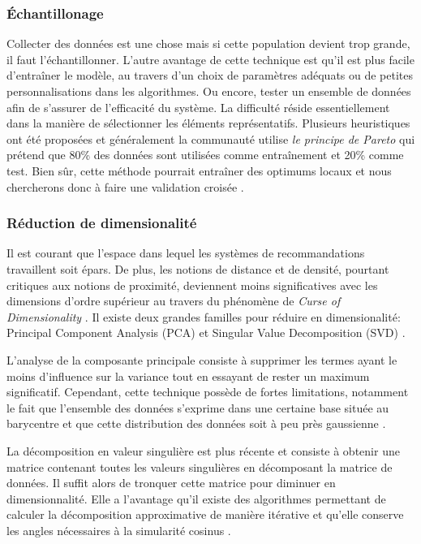 \subsubsection{Échantillonage}

Collecter des données est une chose mais si cette population devient trop grande, il faut l'échantillonner. L'autre avantage de cette technique est qu'il est plus facile d'entraîner le modèle, au travers d'un choix de paramètres adéquats ou de petites personnalisations dans les algorithmes. Ou encore, tester un ensemble de données afin de s'assurer de l'efficacité du système. La difficulté réside essentiellement dans la manière de sélectionner les éléments représentatifs. Plusieurs heuristiques ont été proposées et généralement la communauté utilise \textit{le principe de Pareto} qui prétend que 80\% des données sont utilisées comme entraînement et 20\% comme test. Bien sûr, cette méthode pourrait entraîner des optimums locaux et nous chercherons donc à faire une validation croisée \cite{kohavi1995study}.

\subsubsection{Réduction de dimensionalité} \label{subsubsec:Dimensionality Reduction}

Il est courant que l'espace dans lequel les systèmes de recommandations travaillent soit épars. De plus, les notions de distance et de densité, pourtant critiques aux notions de proximité, deviennent moins significatives avec les dimensions d'ordre supérieur au travers du phénomène de \textit{Curse of Dimensionality} \cite{bellman1957dynamic}. Il existe deux grandes familles pour réduire en dimensionalité: Principal Component Analysis (PCA) et Singular Value Decomposition (SVD) \cite{koren2009matrix}.

L'analyse de la composante principale consiste à supprimer les termes ayant le moins d'influence sur la variance tout en essayant de rester un maximum significatif. Cependant, cette technique possède de fortes limitations, notamment le fait que l'ensemble des données s'exprime dans une certaine base située au barycentre et que cette distribution des données soit à peu près gaussienne \cite{pearson1901liii}.

La décomposition en valeur singulière est plus récente et consiste à obtenir une matrice contenant toutes les valeurs singulières en décomposant la matrice de données. Il suffit alors de tronquer cette matrice pour diminuer en dimensionnalité. Elle a l'avantage qu'il existe des algorithmes permettant de calculer la décomposition approximative de manière itérative et qu'elle conserve les angles nécessaires à la simularité cosinus \cite{golub1970singular}.

